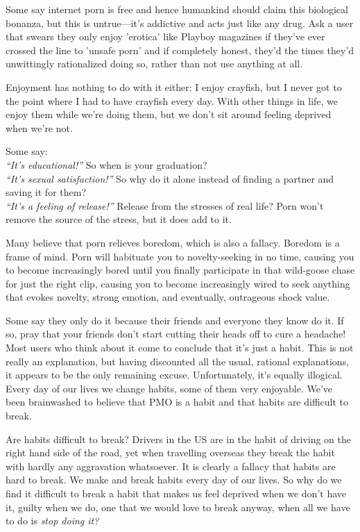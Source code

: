 \documentclass[
]{book}
\begin{document}
Some say internet porn is free and hence humankind should claim this biological bonanza, but this is untrue---it's addictive and acts just like any drug. Ask a user that swears they only enjoy 'erotica' like Playboy magazines if they've ever crossed the line to 'unsafe porn' and if completely honest, they'd the times they'd unwittingly rationalized doing so, rather than not use anything at all.

Enjoyment has nothing to do with it either: I enjoy crayfish, but I never got to the point where I had to have crayfish every day. With other things in life, we enjoy them while we're doing them, but we don't sit around feeling deprived when we're not.

Some say:\\
\emph{``It's educational!''} So when is your graduation?\\
\emph{``It's sexual satisfaction!''} So why do it alone instead of finding a partner and saving it for them?\\
\emph{``It's a feeling of release!''} Release from the stresses of real life? Porn won't remove the source of the stress, but it does add to it.

Many believe that porn relieves boredom, which is also a fallacy. Boredom is a frame of mind. Porn will habituate you to novelty-seeking in no time, causing you to become increasingly bored until you finally participate in that wild-goose chase for just the right clip, causing you to become increasingly wired to seek anything that evokes novelty, strong emotion, and eventually, outrageous shock value.

Some say they only do it because their friends and everyone they know do it. If so, pray that your friends don't start cutting their heads off to cure a headache! Most users who think about it come to conclude that it's just a habit. This is not really an explanation, but having discounted all the usual, rational explanations, it appears to be the only remaining excuse. Unfortunately, it's equally illogical. Every day of our lives we change habits, some of them very enjoyable. We've been brainwashed to believe that PMO is a habit and that habits are difficult to break.

Are habits difficult to break? Drivers in the US are in the habit of driving on the right hand side of the road, yet when travelling overseas they break the habit with hardly any aggravation whatsoever. It is clearly a fallacy that habits are hard to break. We make and break habits every day of our lives. So why do we find it difficult to break a habit that makes us feel deprived when we don't have it, guilty when we do, one that we would love to break anyway, when all we have to do is \emph{stop doing it?}
\end{document}
